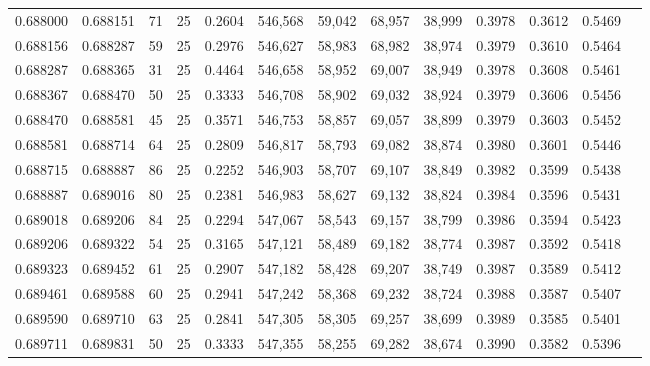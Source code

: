 \begin{tabular}{rrrrrrrrrrrrr}
0.688000 & 0.688151 &    71 &  25 &                                     0.2604 & 546,568 &  59,042 &  68,957 &  38,999 & 0.3978 & 0.3612 & 0.5469 \\
0.688156 & 0.688287 &    59 &  25 &                                     0.2976 & 546,627 &  58,983 &  68,982 &  38,974 & 0.3979 & 0.3610 & 0.5464 \\
0.688287 & 0.688365 &    31 &  25 &                                     0.4464 & 546,658 &  58,952 &  69,007 &  38,949 & 0.3978 & 0.3608 & 0.5461 \\
0.688367 & 0.688470 &    50 &  25 &                                     0.3333 & 546,708 &  58,902 &  69,032 &  38,924 & 0.3979 & 0.3606 & 0.5456 \\
0.688470 & 0.688581 &    45 &  25 &                                     0.3571 & 546,753 &  58,857 &  69,057 &  38,899 & 0.3979 & 0.3603 & 0.5452 \\
0.688581 & 0.688714 &    64 &  25 &                                     0.2809 & 546,817 &  58,793 &  69,082 &  38,874 & 0.3980 & 0.3601 & 0.5446 \\
0.688715 & 0.688887 &    86 &  25 &                                     0.2252 & 546,903 &  58,707 &  69,107 &  38,849 & 0.3982 & 0.3599 & 0.5438 \\
0.688887 & 0.689016 &    80 &  25 &                                     0.2381 & 546,983 &  58,627 &  69,132 &  38,824 & 0.3984 & 0.3596 & 0.5431 \\
0.689018 & 0.689206 &    84 &  25 &                                     0.2294 & 547,067 &  58,543 &  69,157 &  38,799 & 0.3986 & 0.3594 & 0.5423 \\
0.689206 & 0.689322 &    54 &  25 &                                     0.3165 & 547,121 &  58,489 &  69,182 &  38,774 & 0.3987 & 0.3592 & 0.5418 \\
0.689323 & 0.689452 &    61 &  25 &                                     0.2907 & 547,182 &  58,428 &  69,207 &  38,749 & 0.3987 & 0.3589 & 0.5412 \\
0.689461 & 0.689588 &    60 &  25 &                                     0.2941 & 547,242 &  58,368 &  69,232 &  38,724 & 0.3988 & 0.3587 & 0.5407 \\
0.689590 & 0.689710 &    63 &  25 &                                     0.2841 & 547,305 &  58,305 &  69,257 &  38,699 & 0.3989 & 0.3585 & 0.5401 \\
0.689711 & 0.689831 &    50 &  25 &                                     0.3333 & 547,355 &  58,255 &  69,282 &  38,674 & 0.3990 & 0.3582 & 0.5396 \\

\end{tabular}
